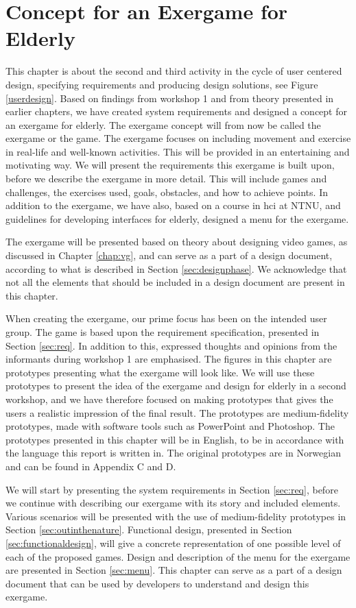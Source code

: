 \chapter{Concept for an Exergame for Elderly}
\label{chap:concept}
This chapter is about the second and third activity in the cycle of user centered design, specifying requirements and producing design solutions, see Figure \ref{userdesign}. Based on findings from workshop 1 and from theory presented in earlier chapters, we have created system requirements and designed a concept for an exergame for elderly. The exergame concept will from now be called the exergame or the game. The exergame focuses on including movement and exercise in real-life and well-known activities. This will be provided in an entertaining and motivating way. We will present the requirements this exergame is built upon, before we describe the exergame in more detail. This will include games and challenges, the exercises used, goals, obstacles, and how to achieve points. In addition to the exergame, we have also, based on a course in \ac{hci} at NTNU, and guidelines for developing interfaces for elderly, designed a menu for the exergame. 

The exergame will be presented based on theory about designing video games, as discussed in Chapter \ref{chap:vg}, and can serve as a part of a design document, according to what is described in Section \ref{sec:designphase}. We acknowledge that not all the elements that should be included in a design document are present in this chapter.

When creating the exergame, our prime focus has been on the intended user group. The game is based upon the requirement specification, presented in Section \ref{sec:req}. In addition to this, expressed thoughts and opinions from the informants during workshop 1 are emphasised. The figures in this chapter are prototypes presenting what the exergame will look like. We will use these prototypes to present the idea of the exergame and design for elderly in a second workshop, and we have therefore focused on making prototypes that gives the users a realistic impression of the final result. The prototypes are medium-fidelity prototypes, made with software tools such as PowerPoint and Photoshop. The prototypes presented in this chapter will be in English, to be in accordance with the language this report is written in. The original prototypes are in Norwegian and can be found in Appendix C and D. 

We will start by presenting the system requirements in Section \ref{sec:req}, before we continue with describing our exergame with its story and included elements. Various scenarios will be presented with the use of medium-fidelity prototypes in Section \ref{sec:outinthenature}. Functional design, presented in Section \ref{sec:functionaldesign}, will give a concrete representation of one possible level of each of the proposed games. Design and description of the menu for the exergame are presented in Section \ref{sec:menu}. This chapter can serve as a part of a design document that can be used by developers to understand and design this exergame.  

